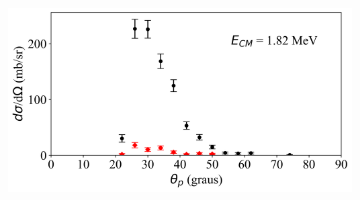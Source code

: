 \documentclass[a4paper,12pt,oneside]{book}
\begin{document}
\begin{figure}[H]
\begin{subfigure}[b]{0.48\textwidth}
        \caption{}
        \label{subfig:dist_ang_u}
    \end{subfigure}%
    \hfill
    \begin{subfigure}[b]{0.48\textwidth}
        \centering
        \includegraphics[scale=0.38, width=1.\columnwidth]{figs/dist_angs/dist_ang_21.png}
        \caption{}
        \label{subfig:dist_ang_v}
    \end{subfigure}
\end{figure}
\end{document}
